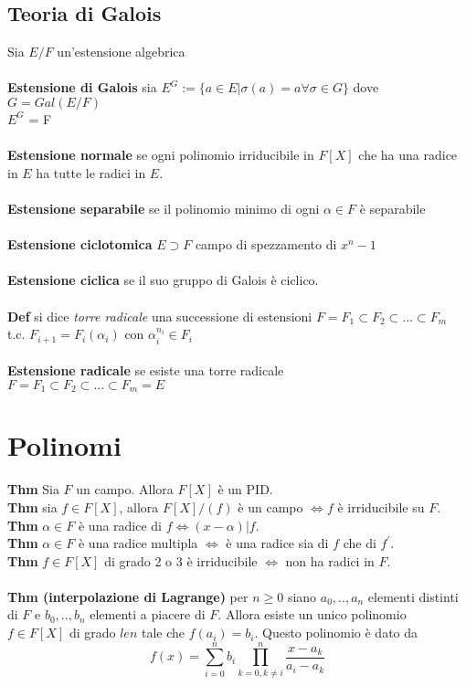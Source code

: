 \documentclass[10pt,a4paper]{article}
\begin{document}
\subsection{Teoria di Galois}
Sia $E/F$ un'estensione algebrica\\\\
\textbf{Estensione di Galois} sia $E^G := \{a \in E | \sigma(a) =a \forall \sigma \in G\} $ dove $G=Gal(E/F)$\\$E^G$ = F \\\\
\textbf{Estensione normale} se ogni polinomio irriducibile in $F[X]$ che ha una radice in $E$ ha tutte le radici in $E$.\\\\
\textbf{Estensione separabile} se il polinomio minimo di ogni $\alpha \in F$ è separabile \\\\
\textbf{Estensione ciclotomica} $E \supset F $ campo di spezzamento di $x^n-1$\\\\
\textbf{Estensione ciclica} se il suo gruppo di Galois è ciclico.\\\\
\textbf{Def} si dice \textit{torre radicale} una successione di estensioni $F=F_1 \subset F_2 \subset ... \subset F_m$ t.c. $F_{i+1} = F_i(\alpha_i)$ con $\alpha_i^{n_i} \in F_i$ \\\\
\textbf{Estensione radicale} se esiste una torre radicale \\
$F=F_1 \subset F_2 \subset ... \subset F_m = E$
\newpage
\section{Polinomi}
\textbf{Thm} Sia $F$ un campo. Allora $F[X]$ è un PID.\\
\textbf{Thm} sia $f \in F[X]$, allora $F[X]/(f)$ è un campo $\iff f$ è irriducibile su $F$.\\
\textbf{Thm} $\alpha \in F$ è una radice di $f \iff (x-\alpha) | f$.\\
\textbf{Thm} $\alpha \in F$ è una radice multipla $\iff$ è una radice sia di $f$ che di $f^{'}$.\\
\textbf{Thm} $f\in F[X]$ di grado 2 o 3 è irriducibile $\iff$ non ha radici in $F$.\\\\
\textbf{Thm (interpolazione di Lagrange)} per $n \ge 0$ siano $a_0,..,a_n$ elementi distinti di $F$ e $b_0,..,b_n$ elementi a piacere di $F$. Allora esiste un unico polinomio $f\in F[X]$ di grado $le n$ tale che $f(a_i)=b_i$. Questo polinomio è dato da
$$ f(x) = \sum_{i=0}^n b_i \prod_{k=0, k \neq i}^n \frac{x-a_k}{a_i-a_k}$$
\end{document}
